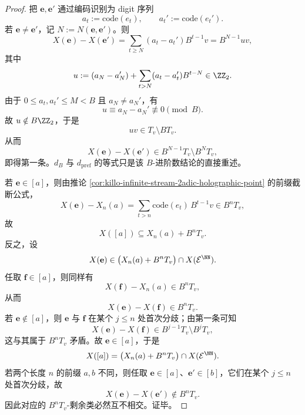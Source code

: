 \begin{proof}
把 \(\mathbf e,\mathbf e'\) 通过编码识别为 digit 序列
\[
a_t:=\mathrm{code}(e_t),
\qquad
a_t':=\mathrm{code}(e_t').
\]
若 \(\mathbf e\neq \mathbf e'\)，记 \(N:=N(\mathbf e,\mathbf e')\)。则
\[
X(\mathbf e)-X(\mathbf e')
=
\sum_{t\ge N}(a_t-a_t')B^{t-1}v
=
B^{N-1}uv,
\]
其中
\[
u:=(a_N-a_N')+\sum_{t>N}(a_t-a_t')B^{t-N}\in\ZZ_2.
\]
由于 \(0\le a_t,a_t'\le M<B\) 且 \(a_N\neq a_N'\)，有
\[
u\equiv a_N-a_N'\not\equiv 0\pmod B.
\]
故 \(u\notin B\ZZ_2\)，于是
\[
uv\in T_v\setminus B T_v.
\]
从而
\[
X(\mathbf e)-X(\mathbf e')
\in
B^{N-1}T_v\setminus B^N T_v,
\]
即得第一条。\(d_B\) 与 \(d_{\mathrm{pref}}\) 的等式只是该 \(B\)-进阶数结论的直接重述。

若 \(\mathbf e\in[a]\)，则由推论 \ref{cor:killo-infinite-stream-2adic-holographic-point} 的前缀截断公式，
\[
X(\mathbf e)-X_n(a)=\sum_{t>n}\mathrm{code}(e_t)\,B^{t-1}v\in B^nT_v,
\]
故
\[
X([a])\subseteq X_n(a)+B^nT_v.
\]
反之，设
\[
X(\mathbf e)\in \bigl(X_n(a)+B^nT_v\bigr)\cap X(\mathcal E^{\NN}).
\]
任取 \(\mathbf f\in[a]\)，则同样有
\[
X(\mathbf f)-X_n(a)\in B^nT_v,
\]
从而
\[
X(\mathbf e)-X(\mathbf f)\in B^nT_v.
\]
若 \(\mathbf e\notin[a]\)，则 \(\mathbf e\) 与 \(\mathbf f\) 在某个 \(j\le n\) 处首次分歧；由第一条可知
\[
X(\mathbf e)-X(\mathbf f)\in B^{j-1}T_v\setminus B^jT_v,
\]
这与其属于 \(B^nT_v\) 矛盾。故 \(\mathbf e\in[a]\)，于是
\[
X([a])=\bigl(X_n(a)+B^nT_v\bigr)\cap X(\mathcal E^{\NN}).
\]
若两个长度 \(n\) 的前缀 \(a,b\) 不同，则任取 \(\mathbf e\in[a]\)、\(\mathbf e'\in[b]\)，它们在某个 \(j\le n\) 处首次分歧，故
\[
X(\mathbf e)-X(\mathbf e')\notin B^nT_v.
\]
因此对应的 \(B^nT_v\)-剩余类必然互不相交。证毕。
\end{proof}

